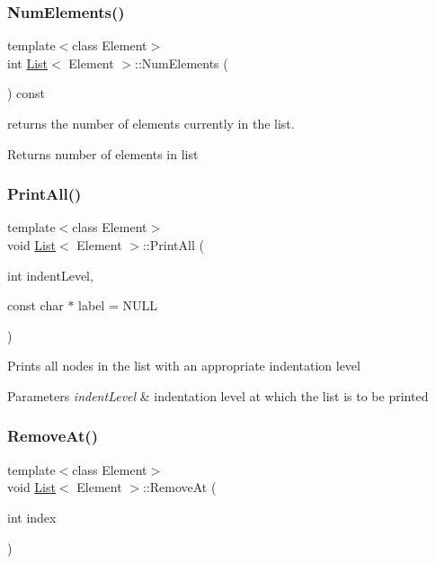 \subsubsection{\texorpdfstring{Num\+Elements()}{NumElements()}}
{\footnotesize\ttfamily template$<$class Element$>$ \\
int \hyperlink{class_list}{List}$<$ Element $>$\+::Num\+Elements (\begin{DoxyParamCaption}{ }\end{DoxyParamCaption}) const\hspace{0.3cm}{\ttfamily [inline]}}

returns the number of elements currently in the list. \begin{DoxyReturn}{Returns}
number of elements in list 
\end{DoxyReturn}
\mbox{\label{class_list_a54eba5c4ab139128c47bc535b276be3a}} 
\subsubsection{\texorpdfstring{Print\+All()}{PrintAll()}}
{\footnotesize\ttfamily template$<$class Element$>$ \\
void \hyperlink{class_list}{List}$<$ Element $>$\+::Print\+All (\begin{DoxyParamCaption}\item[{int}]{indent\+Level,  }\item[{const char $\ast$}]{label = {\ttfamily NULL} }\end{DoxyParamCaption})\hspace{0.3cm}{\ttfamily [inline]}}

Prints all nodes in the list with an appropriate indentation level 
\begin{DoxyParams}{Parameters}
{\em indent\+Level} & indentation level at which the list is to be printed \\
\hline
\end{DoxyParams}
\mbox{\label{class_list_af17f72d263f90d53ea8501b5b1853470}} 
\subsubsection{\texorpdfstring{Remove\+At()}{RemoveAt()}}
{\footnotesize\ttfamily template$<$class Element$>$ \\
void \hyperlink{class_list}{List}$<$ Element $>$\+::Remove\+At (\begin{DoxyParamCaption}\item[{int}]{index }\end{DoxyParamCaption})\hspace{0.3cm}{\ttfamily [inline]}}

